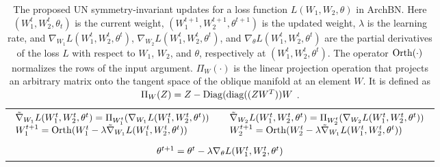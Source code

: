 \documentclass{article} %
\newcommand{\Diag}{{\rm Diag}}
\newcommand{\diag}{{\rm diag}}
\newcommand{\Orth}{{\rm Orth}}
\begin{document}
\begin{table*}[t]%
\center \scriptsize %
\begin{tabular}{|c c|}
\hline
$\begin{array}[t]{lll}
\tilde{{\nabla}}_{W_1} L (W_1^t, W_2^t, \theta^t) = \Pi_{W_1^t}({{\nabla}}_{W_1} L (W_1^t, W_2^t, \theta^t))\\
W_1^{t+1} = {\Orth}({W_1^t} - \lambda \tilde{{\nabla}}_{W_1} L (W_1^t, W_2^t, \theta^t))
\end{array} $ 
&
 $\begin{array}[t]{lll}
\tilde{{\nabla}}_{W_2} L (W_1^t, W_2^t, \theta^t) = \Pi_{W_2^t}({{\nabla}}_{W_2} L (W_1^t, W_2^t, \theta^t))\\
W_2^{t+1} = {\Orth}({W_2^t} - \lambda \tilde{{\nabla}}_{W_1} L (W_1^t, W_2^t, \theta^t))
\end{array} $  \\


& \\
\multicolumn{2}{|c|}{
$\begin{array}[t]{lll}
\theta^{t+1} = \theta^t - \lambda  {\nabla}_{\theta} L (W_1^t, W_2^t, \theta^t) 
\end{array} $ } \\

\hline
\end{tabular}%
\caption{\footnotesize{The proposed UN symmetry-invariant updates for a loss function $L(W_1, W_2, \theta)$ in ArchBN. Here $(W_1^t, W_2^t ,\theta_t)$ is the current weight, $(W_1^{t+1} , W_2^{t+1}, \theta^{t+1})$ is the updated weight, $\lambda$ is the learning rate, and ${\nabla}_{W_1} L (W_1^t, W_2^t,\theta^t)$,  ${\nabla}_{W_2} L (W_1^t, W_2^t, \theta^t)$, and ${\nabla}_{\theta} L (W_1^t, W_2^t, \theta^t)$ are the partial derivatives of the loss $L$ with respect to $W_1$, $W_2$, and $\theta$, respectively at $(W_1^t, W_2^t, \theta ^t)$. The operator $\Orth(\cdot)$ normalizes the rows of the input argument. $\Pi_W(\cdot)$ is the linear projection operation that projects an arbitrary matrix onto the tangent space of the oblique manifold at an element $W$. It is defined as $\Pi_W(Z) = Z - \Diag(\diag((ZW^T))W$ \cite{ManOpt}.}}
\label{ProposedUpdates}
\end{table*}
\end{document}

